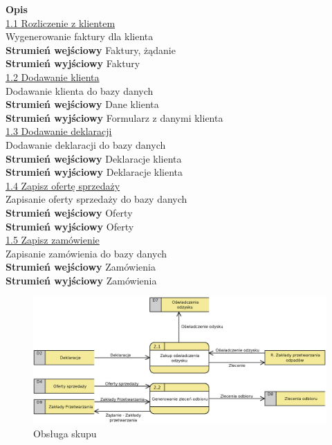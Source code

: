 	\textbf{Opis} \\
	\underline{1.1 Rozliczenie z klientem}\\
	Wygenerowanie faktury dla klienta \\
	\textbf{Strumień wejściowy} Faktury, żądanie \\
	\textbf{Strumień wyjściowy} Faktury \\

	\underline{1.2 Dodawanie klienta}\\
	Dodawanie klienta do bazy danych \\
	\textbf{Strumień wejściowy} Dane klienta \\
	\textbf{Strumień wyjściowy} Formularz z danymi klienta \\

	\underline{1.3 Dodawanie deklaracji}\\
	Dodawanie deklaracji do bazy danych \\
	\textbf{Strumień wejściowy} Deklaracje klienta \\
	\textbf{Strumień wyjściowy} Deklaracje klienta \\

	\underline{1.4 Zapisz ofertę sprzedaży}\\
	Zapisanie oferty sprzedaży do bazy danych \\
	\textbf{Strumień wejściowy} Oferty \\
	\textbf{Strumień wyjściowy} Oferty \\

	\underline{1.5 Zapisz zamówienie}\\
	Zapisanie zamówienia do bazy danych \\
	\textbf{Strumień wejściowy} Zamówienia \\
	\textbf{Strumień wyjściowy} Zamówienia \\

	\begin{figure}[H]
		\centering
		\centerline{\includegraphics[width=1.1\textwidth]{img/DFD/2-level-skup.eps}}
		\caption{Obsługa skupu}
	\end{figure}
	
